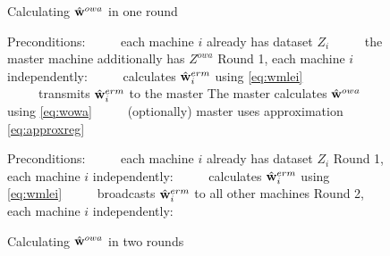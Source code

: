 \documentclass[thesis.tex]{subfiles}
\newcommand{\Zowa}{Z^{\textit{owa}}}
\begin{document}
\begin{wrapfigure}{R}{0.475\textwidth}
\vspace{-0.30in}
\begin{minipage}{0.475\textwidth}
\begin{algorithm}[H]
\caption{Calculating $\hat{\mathbf w}^{owa}$ in one round}
\label{alg:distributed}
\begin{algorithmic}
    \State \hspace{-0.1in}Preconditions: 
    \State \hspace{-0.1in}~~~~~each machine $i$ already has dataset $Z_i$
    \State \hspace{-0.1in}~~~~~the master machine additionally has $\Zowa$
    \State \hspace{-0.1in}Round 1, each machine $i$ independently:
    \State \hspace{-0.1in}~~~~~calculates $\hat{\mathbf w}^{erm}_i$ using \eqref{eq:wmlei}
    \State \hspace{-0.1in}~~~~~transmits $\hat{\mathbf w}^{erm}_i$ to the master
    \State \hspace{-0.1in}The master calculates $\hat{\mathbf w}^{owa}$ using \eqref{eq:wowa} %
    \State \hspace{-0.1in}~~~~~(optionally) master uses approximation \eqref{eq:approxreg}
\end{algorithmic}
\label{fig:alg1}
\end{algorithm}
\vspace{-0.25in}
\begin{algorithm}[H]
\caption{Calculating $\hat{\mathbf w}^{owa}$ in two rounds}
\label{alg:distributed}
\begin{algorithmic}
    \State \hspace{-0.1in}Preconditions:
    \State \hspace{-0.1in}~~~~~each machine $i$ already has dataset $Z_i$
    \State \hspace{-0.1in}Round 1, each machine $i$ independently:
    \State \hspace{-0.1in}~~~~~calculates $\hat{\mathbf w}^{erm}_i$ using \eqref{eq:wmlei}
    \State \hspace{-0.1in}~~~~~broadcasts $\hat{\mathbf w}^{erm}_i$ to all other machines
    \State \hspace{-0.1in}Round 2, each machine $i$ independently:

\end{algorithmic}
\end{algorithm}
\end{minipage}
\end{wrapfigure}
\end{document}
